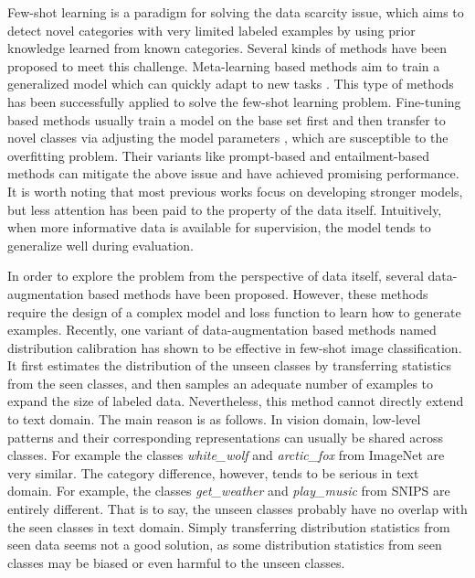 \documentclass[letterpaper]{article} %
\begin{document}
Few-shot learning is a paradigm for solving the data
scarcity issue, which aims to detect novel categories with very limited labeled examples by using prior knowledge learned from known categories. Several kinds of methods have been proposed to meet this challenge. Meta-learning based methods aim to train a generalized model which can quickly adapt to new tasks \cite{finn2017model, mann, snell2017prototypical,DBLP:conf/emnlp/LiuZ0ZZ21,DBLP:conf/kdd/LiuZ0ZS0Z22}. This type of methods has been successfully applied to solve the few-shot learning problem. Fine-tuning based methods usually train a model on the base set first and then transfer to novel classes via adjusting the model parameters \cite{howard-ruder-2018-universal, gururangan-etal-2020-dont}, which are susceptible to the overfitting problem. Their variants like prompt-based and entailment-based methods \cite{lmbff,efl} can mitigate the above issue and have achieved promising performance. It is worth noting that most previous works focus on developing stronger models, but less attention has been paid to the property of the data itself. Intuitively, when more informative data is available for supervision, the model tends to generalize well during evaluation.

In order to explore the problem from the perspective of data itself, several data-augmentation based methods \cite{DBLP:conf/acl-deeplo/KumarGLC19,ProtAugment,ContrastNet} have been proposed. However, these methods require the design of a complex model and loss function to learn how to generate examples. Recently, one variant of data-augmentation based methods named distribution calibration has shown to be effective in few-shot image classification. It first estimates the distribution of the unseen classes by transferring statistics from the seen classes, and then samples an adequate number of examples to expand the size of labeled data. Nevertheless, this method cannot directly extend to text domain. The main reason is as follows. In vision domain, low-level patterns and their corresponding representations can usually be shared across classes. For example the classes \emph{white\_wolf} and \emph{arctic\_fox} from ImageNet \cite{DBLP:conf/cvpr/DengDSLL009} are very similar. The category difference, however, tends to be serious in text domain. For example, the classes \emph{get\_weather} and \emph{play\_music} from SNIPS \cite{snips} are entirely different. That is to say, the unseen classes probably have no overlap with the seen classes in text domain. Simply transferring distribution statistics from seen data seems not a good solution, as some distribution statistics from seen classes may be biased or even harmful to the unseen classes.
\end{document}
